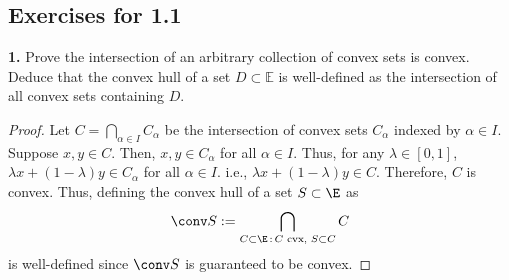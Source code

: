 \documentclass[12pt, letterpaper]{article}
\numberwithin{equation}{subsection}
\begin{document}
\subsection{Exercises for 1.1}
\noindent\textbf{1.} Prove the intersection of an arbitrary 
collection of convex sets is convex. Deduce that the convex hull of a 
set $D\subset \mathbb E$ is well-defined as the intersection of all
convex sets containing $D$.
\begin{proof}
Let $C=\bigcap_{\alpha\in I} C_\alpha$ be the intersection of convex sets 
$C_\alpha$ indexed by $\alpha\in I$. Suppose $x,y\in C$. Then, 
$x,y\in C_{\alpha}$ for all $\alpha\in I$. Thus, for any $\lambda\in[0,1]$,
$\lambda x + (1-\lambda) y\in C_{\alpha}$ for all $\alpha\in I$. i.e., 
$\lambda x + (1-\lambda) y\in C$. Therefore, $C$ is convex.
Thus, defining the convex hull of a set $S\subset\E$ as 
\begin{equation*}
\conv S := \bigcap_{C\subset \E\,:\, C\text{ cvx, } S\subset C} C
\end{equation*}
is well-defined since $\conv S$ is guaranteed to be convex.
\end{proof}
\end{document}
